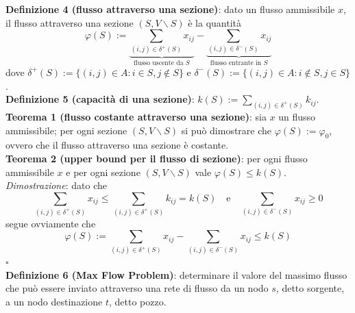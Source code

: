 \textbf{Definizione 4 (flusso attraverso una sezione)}: dato un flusso ammissibile $x$, il flusso attraverso una sezione $(S,V\backslash S)$ è la quantità
\begin{equation*}
	\varphi (S):=\underbrace{\sum_{(i,j)\in \delta^+(S)}x_{ij}}_{\textrm{flusso uscente da } S}-\underbrace{\sum_{(i,j)\in \delta^-(S)}x_{ij}}_{\textrm{flusso entrante in } S}
\end{equation*}
dove $\delta^+(S):=\{(i,j)\in A:i\in S, j \notin S\}$ e $\delta^-(S):=\{(i,j)\in A:i\notin S, j\in S\}$.\\

\textbf{Definizione 5 (capacità di una sezione)}: $k(S):=\sum_{(i,j)\in \delta^+(S)}k_{ij}$.\\

\textbf{Teorema 1 (flusso costante attraverso una sezione)}: sia $x$ un flusso ammissibile; per ogni sezione $(S,V\backslash S)$ si può dimostrare che $\varphi (S):=\varphi_0$, ovvero che il flusso attraverso una sezione è costante.\\

\textbf{Teorema 2 (upper bound per il flusso di sezione)}: per ogni flusso ammissibile $x$ e per ogni sezione $(S,V\backslash S)$ vale $\varphi (S)\le k(S)$.\\
\textit{Dimostrazione}: dato che
\begin{equation*}
	\sum_{(i,j)\in \delta^+(S)}x_{ij}\le \sum_{(i,j)\in \delta^+(S)}k_{ij}=k(S) \quad \textrm{e} \quad \sum_{(i,j)\in \delta^-(S)}x_{ij}\ge 0
\end{equation*}
segue ovviamente che
\begin{equation*}
	\varphi (S):=\sum_{(i,j)\in \delta^+(S)}x_{ij}-\sum_{(i,j)\in \delta^-(S)}x_{ij}\le k(S)
\end{equation*}
$\square$\\

\textbf{Definizione 6 (Max Flow Problem)}: determinare il valore del massimo flusso che può essere inviato attraverso una rete di flusso da un nodo $s$, detto sorgente, a un nodo destinazione $t$, detto pozzo.

